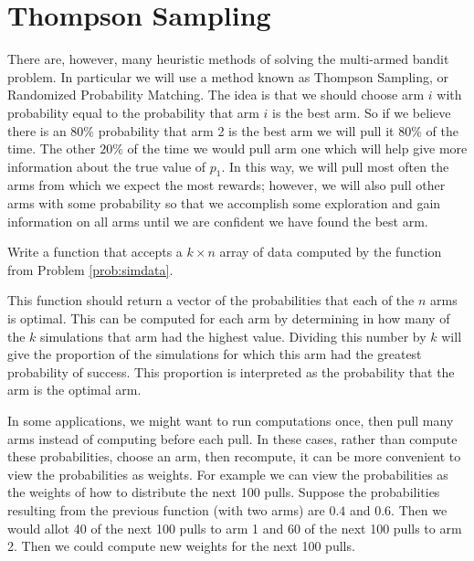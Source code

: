 \section*{Thompson Sampling}

There are, however, many heuristic methods of solving the multi-armed bandit problem.
In particular we will use a method known as Thompson Sampling, or Randomized Probability Matching.
The idea is that we should choose arm $i$ with probability equal to the probability
that arm $i$ is the best arm.  So if we believe there is an $80\%$ probability that
arm 2 is the best arm we will pull it $80\%$ of the time.  The other $20\%$ of the
time we would pull arm one which will help give more information about the true value of $p_1$.
In this way, we will pull most often the arms from which we expect the most rewards;
however, we will also pull other arms with some probability so that we accomplish some
exploration and gain information on all arms until we are confident we have found the best arm.

\begin{problem}
Write a function  that accepts a $k \times n$ array of data computed by the
function from Problem \ref{prob:simdata}.

This function should return a vector of the probabilities that each of the $n$ arms is optimal.
This can be computed for each arm by determining in how many of the $k$ simulations
that arm had the highest value.  Dividing this number by $k$ will give the proportion
of the simulations for which this arm had the greatest probability of success.
This proportion is interpreted as the probability that the arm is the optimal arm.
\end{problem}

In some applications, we might want to run computations once, then pull many arms instead
of computing before each pull.  In these cases, rather than compute these probabilities,
choose an arm, then recompute, it can be more convenient to view the probabilities as weights.
For example we can view the probabilities as the weights of how to distribute the next 100 pulls.
Suppose the probabilities resulting from the previous function (with two arms) are $0.4$ and $0.6$.
Then we would allot 40 of the next 100 pulls to arm 1 and 60 of the next 100 pulls to arm 2.
Then we could compute new weights for the next 100 pulls.

